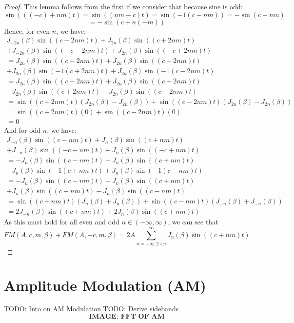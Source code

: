\documentclass[11pt,twoside]{report}
\numberwithin{thm}{section}
\numberwithin{equation}{section}
\begin{document}
\begin{proof} This lemma follows from the first if we consider that because sine is odd:
$$\sin(((-c) + nm)t) = \sin((nm -c)t) = \sin(-1(c - nm)) = -\sin(c - nm)$$
$$= -\sin(c + n(-m))$$
Hence, for even $n$, we have:
\begin{align*}
    J_{-2n}(\beta)\sin((c-2nm)t) + J_{2n}(\beta)\sin((c+2nm)t) \\
    + J_{-2n}(\beta)\sin((-c-2nm)t) + J_{2n}(\beta)\sin((-c+2nm)t) \\
     = J_{2n}(\beta)\sin((c-2nm)t) + J_{2n}(\beta)\sin((c+2nm)t) \\
    + J_{2n}(\beta)\sin(-1(c+2nm)t) + J_{2n}(\beta)\sin(-1(c-2nm)t) \\
    = J_{2n}(\beta)\sin((c-2nm)t) + J_{2n}(\beta)\sin((c+2nm)t) \\
    - J_{2n}(\beta)\sin((c+2nm)t) - J_{2n}(\beta)\sin((c-2nm)t) \\
    =\sin((c+2nm)t)(J_{2n}(\beta) - J_{2n}(\beta)) + \sin((c-2nm)t)(J_{2n}(\beta)- J_{2n}(\beta)) \\
    =\sin((c+2nm)t)(0) + \sin((c-2nm)t)(0) \\
    = 0
\end{align*}
And for odd $n$, we have:
\begin{align*}
    J_{-n}(\beta)\sin((c-nm)t) + J_{n}(\beta)\sin((c+nm)t) \\
    + J_{-n}(\beta)\sin((-c-nm)t) + J_{n}(\beta)\sin((-c+nm)t) \\
     = -J_{n}(\beta)\sin((c-nm)t) + J_{n}(\beta)\sin((c+nm)t) \\
    - J_{n}(\beta)\sin(-1(c+nm)t) + J_{n}(\beta)\sin(-1(c-nm)t) \\
    = - J_{n}(\beta)\sin((c-nm)t) + J_{n}(\beta)\sin((c+nm)t) \\
    + J_{n}(\beta)\sin((c+nm)t) - J_{n}(\beta)\sin((c-nm)t) \\
    =\sin((c+nm)t)(J_{n}(\beta) + J_{n}(\beta)) + \sin((c-nm)t)(J_{-n}(\beta) + J_{-n}(\beta)) \\
    = 2J_{-n}(\beta)\sin((c+nm)t) + 2J_{n}(\beta)\sin((c+nm)t)
\end{align*}
As this must hold for all even and odd $n \in (-\infty, \infty)$, we can see that
$$FM(A, c, m, \beta) + FM(A, -c, m, \beta) = 2A\sum_{n=-\infty, 2\nmid n}^\infty J_{n}(\beta)\sin((c + nm)t) $$
\end{proof}
\section{Amplitude Modulation (AM)}
TODO: Into on AM Modulation
TODO: Derive sidebands
$$\textbf{IMAGE: FFT OF AM}$$
\end{document}
